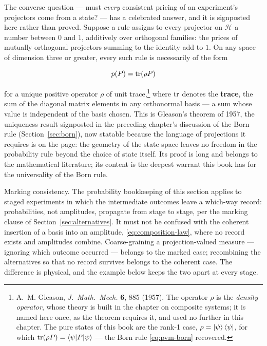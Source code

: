 The converse question --- must \emph{every} consistent pricing of an experiment's projectors come from a state? --- has a celebrated answer, and it is signposted here rather than proved. Suppose a rule assigns to every projector on $\mathcal{H}$ a number between $0$ and $1$, additively over orthogonal families: the prices of mutually orthogonal projectors summing to the identity add to $1$. On any space of dimension three or greater, every such rule is necessarily of the form
\begin{linenomath}
    \begin{equation}
        p(P) = \mathrm{tr}(\rho P)
        \label{eq:gleason}
    \end{equation}
\end{linenomath}
for a unique positive operator $\rho$ of unit trace,\footnote{A.~M. Gleason, \emph{J.~Math.~Mech.} \textbf{6}, 885 (1957). The operator $\rho$ is the \emph{density operator}, whose theory is built in the chapter on composite systems; it is named here once, as the theorem requires it, and used no further in this chapter. The pure states of this book are the rank-1 case, $\rho = \ket{\psi}\bra{\psi}$, for which $\mathrm{tr}(\rho P) = \braket{\psi|P|\psi}$ --- the Born rule \eqref{eq:pvm-born} recovered.} where $\mathrm{tr}$ denotes the \textbf{trace}, the sum of the diagonal matrix elements in any orthonormal basis --- a sum whose value is independent of the basis chosen. This is Gleason's theorem of 1957, the uniqueness result signposted in the preceding chapter's discussion of the Born rule (Section~\ref{sec:born}), now statable because the language of projections it requires is on the page: the geometry of the state space leaves no freedom in the probability rule beyond the choice of state itself. Its proof is long and belongs to the mathematical literature; its content is the deepest warrant this book has for the universality of the Born rule.

\begin{note}
    Marking consistency. The probability bookkeeping of this section applies to staged experiments in which the intermediate outcomes leave a which-way record: probabilities, not amplitudes, propagate from stage to stage, per the marking clause of Section~\ref{sec:alternatives}. It must not be confused with the coherent insertion of a basis into an amplitude, \eqref{eq:composition-law}, where no record exists and amplitudes combine. Coarse-graining a projection-valued measure --- ignoring which outcome occurred --- belongs to the marked case; recombining the alternatives so that no record survives belongs to the coherent case. The difference is physical, and the example below keeps the two apart at every stage.
\end{note}

